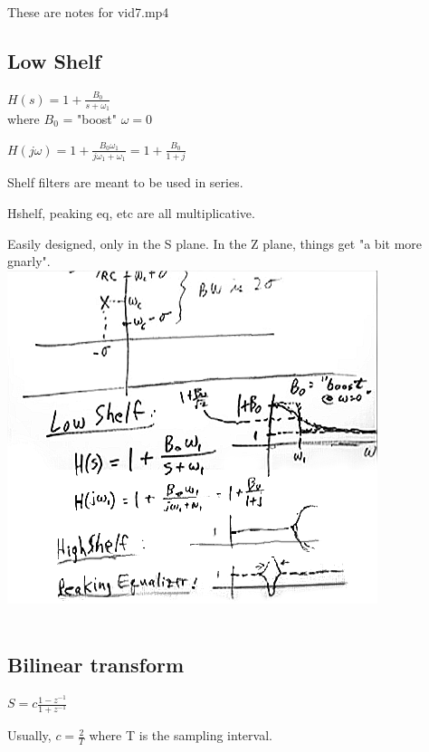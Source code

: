 These are notes for vid7.mp4

\subsection*{Low Shelf}

$H(s) = 1 + \frac{B_0}{s + \omega_1}$ \\

where $B_0$ = "boost"   $\omega = 0$

$H(j\omega) = 1 + \frac{B_0 \omega_1}{j \omega_1 + \omega_1}=
1 + \frac{B_0}{1 + j}$

Shelf filters are meant to be used in series.

Hshelf, peaking eq, etc are all multiplicative.


Easily designed, only in the S plane. In the Z plane, things get 
"a bit more gnarly". \\

\includegraphics[scale=0.5]{frames/10a}\\
\\


\subsection*{Bilinear transform}


$S = c \frac{1 - z^{-1}}{1 + z^{-1}}$

Usually, $c = \frac{2}{T}$ where T is the sampling interval.

